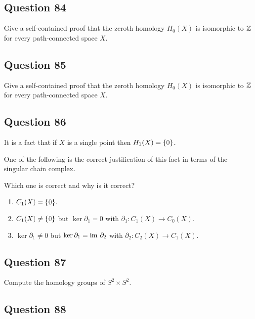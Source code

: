 \documentclass[12pt]{article}
\begin{document}
\hypertarget{question-84-3}{%
\subsection{Question 84}\label{question-84-3}}

Give a self-contained proof that the zeroth homology \(H_0 (X)\) is
isomorphic to \({\mathbb{Z}}\) for every path-connected space \(X\).

\hypertarget{question-85-3}{%
\subsection{Question 85}\label{question-85-3}}

Give a self-contained proof that the zeroth homology \(H_0 (X)\) is
isomorphic to \({\mathbb{Z}}\) for every path-connected space \(X\).

\hypertarget{question-86-2}{%
\subsection{Question 86}\label{question-86-2}}

It is a fact that if \(X\) is a single point then
\(H_1 (X) = \left\{{0}\right\}\).

One of the following is the correct justification of this fact in terms
of the singular chain complex.

Which one is correct and why is it correct?

\begin{enumerate}
\def\labelenumi{\alph{enumi}.}
\item
  \(C_1 (X) = \left\{{0}\right\}\).
\item
  \(C_1 (X) \neq \left\{{0}\right\}\) but \(\ker \partial_1 = 0\) with
  \(\partial_1 : C_1 (X) \to C_0 (X)\).
\item
  \(\ker \partial_1 \neq 0\) but \(\ker \partial_1 = {\text{im}~}\partial_2\)
  with \(\partial_2 : C_2 (X) \to C_1 (X)\).
\end{enumerate}

\hypertarget{question-87-2}{%
\subsection{Question 87}\label{question-87-2}}

Compute the homology groups of \(S^2 \times S^2\).

\hypertarget{question-88-2}{%
\subsection{Question 88}\label{question-88-2}}
\end{document}
